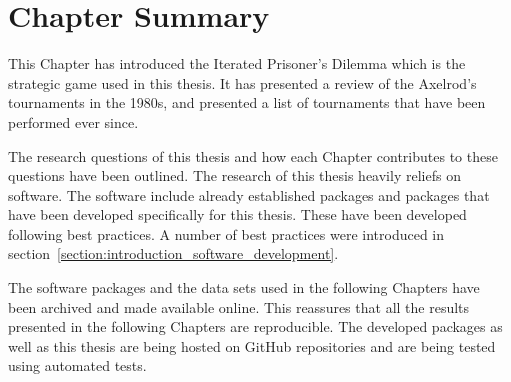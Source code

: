 \section{Chapter Summary}

This Chapter has introduced the Iterated Prisoner's Dilemma which is the
strategic game used in this thesis. It has presented a review of the Axelrod's
tournaments in the 1980s, and presented a list of tournaments that have been
performed ever since.

The research questions of this thesis and how each Chapter contributes to these
questions have been outlined. The research of this thesis heavily reliefs on
software. The software include already established packages and packages that
have been developed specifically for this thesis. These have been developed
following best practices. A number of best practices were introduced in
section~\ref{section:introduction_software_development}.

The software packages and the data sets used in the following Chapters have been
archived and made available online. This reassures that all the results
presented in the following Chapters are reproducible. The developed packages as
well as this thesis are being hosted on GitHub repositories and are being tested
using automated tests.